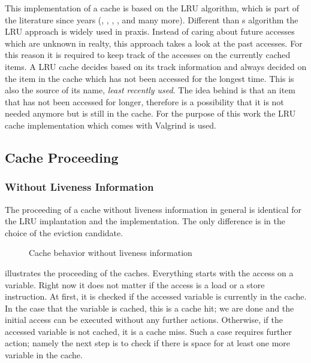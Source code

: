 \documentclass[onecolumn, openright, master, english, signatures]{dbrgrptt}
\begin{document}
This implementation of a cache is based on the \ac{LRU} algorithm, which is part of the literature since years (\cite{johnson1994x3}, \cite{drepper2007every}, \cite{patterson2011computer}, \cite{jacob2010memory}, and many more).
Different than \citeauthor{belady1966study}s algorithm the \ac{LRU} approach is widely used in praxis.
Instead of caring about future accesses which are unknown in realty, this approach takes a look at the past accesses.
For this reason it is required to keep track of the accesses on the currently cached items.
A \ac{LRU} cache decides based on its track information and always decided on the item in the cache which has not been accessed for the longest time.
This is also the source of its name, \emph{least recently used}.
The idea behind is that an item that has not been accessed for longer, therefore is a possibility that it is not needed anymore but is still in the cache.
For the purpose of this work the \ac{LRU} cache implementation which comes with Valgrind is used.

\subsection{Cache Proceeding}
\subsubsection{Without Liveness Information}\label{ssec:cache-behavior}

The proceeding of a cache without liveness information in general is identical for the \ac{LRU} implantation and the  implementation.
The only difference is in the choice of the eviction candidate.

\begin{figure}[!ht]
  \centering
  
  \caption{Cache behavior without liveness information}
  \label{fig:cache-behavior}
\end{figure}

 illustrates the proceeding of the caches.
Everything starts with the access on a variable.
Right now it does not matter if the access is a load or a store instruction.
At first, it is checked if the accessed variable is currently in the cache.
In the case that the variable is cached, this is a cache hit; we are done and the initial access can be executed without any further actions.
Otherwise, if the accessed variable is not cached, it is a cache miss.
Such a case requires further action; namely the next step is to check if there is space for at least one more variable in the cache.
\end{document}
